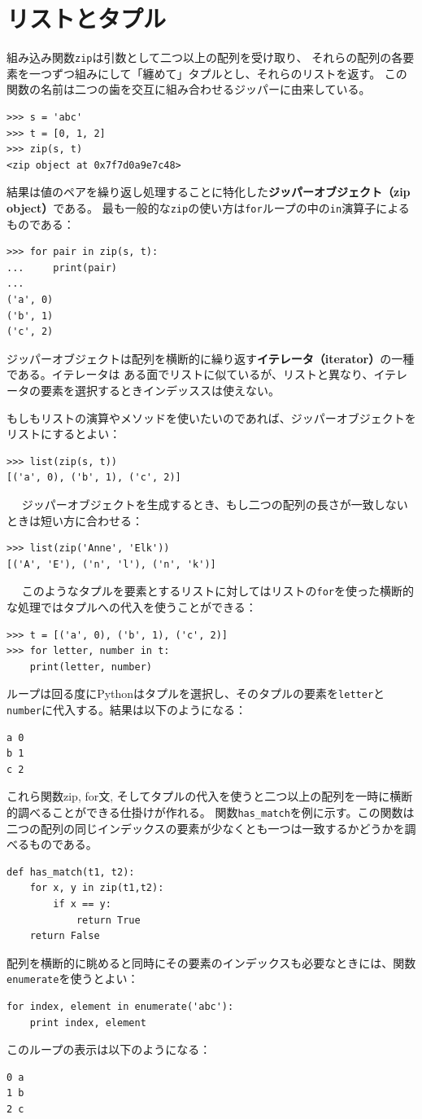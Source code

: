 \documentclass[a4j,12pt,makeidx]{jbook}
\begin{document}
\section{リストとタプル}
組み込み関数{\tt zip}は引数として二つ以上の配列を受け取り、
それらの配列の各要素を一つずつ組みにして「纏めて」タプルとし、それらのリストを返す。
この関数の名前は二つの歯を交互に組み合わせるジッパーに由来している。
\begin{verbatim}
>>> s = 'abc'
>>> t = [0, 1, 2]
>>> zip(s, t)
<zip object at 0x7f7d0a9e7c48>
\end{verbatim}
結果は値のペアを繰り返し処理することに特化した{\bf ジッパーオブジェクト（zip object）}である。
最も一般的な{\tt zip}の使い方は{\tt for}ループの中の{\tt in}演算子によるものである：
\begin{verbatim}
>>> for pair in zip(s, t):
...     print(pair)
...
('a', 0)
('b', 1)
('c', 2)
\end{verbatim}
ジッパーオブジェクトは配列を横断的に繰り返す{\bf イテレータ（iterator）}の一種である。イテレータは
ある面でリストに似ているが、リストと異なり、イテレータの要素を選択するときインデッススは使えない。\par
もしもリストの演算やメソッドを使いたいのであれば、ジッパーオブジェクトをリストにするとよい：
\begin{verbatim}
>>> list(zip(s, t))
[('a', 0), ('b', 1), ('c', 2)]
\end{verbatim}　
\indent
ジッパーオブジェクトを生成するとき、もし二つの配列の長さが一致しないときは短い方に合わせる：
\begin{verbatim}
>>> list(zip('Anne', 'Elk'))
[('A', 'E'), ('n', 'l'), ('n', 'k')]
\end{verbatim}　
\indent
このようなタプルを要素とするリストに対してはリストの{\tt for}を使った横断的な処理ではタプルへの代入を使うことができる：
\begin{verbatim}
>>> t = [('a', 0), ('b', 1), ('c', 2)]
>>> for letter, number in t:
	print(letter, number)
\end{verbatim}
ループは回る度にPythonはタプルを選択し、そのタプルの要素を{\tt letter}と{\tt number}に代入する。結果は以下のようになる：
\begin{verbatim}
a 0
b 1
c 2
\end{verbatim}
これら関数zip, for文, そしてタプルの代入を使うと二つ以上の配列を一時に横断的調べることができる仕掛けが作れる。
関数{\tt has\_match}を例に示す。この関数は二つの配列の同じインデックスの要素が少なくとも一つは一致するかどうかを調べるものである。
\begin{verbatim}
def has_match(t1, t2):
    for x, y in zip(t1,t2):
        if x == y:
            return True
    return False
\end{verbatim} 
\indent
配列を横断的に眺めると同時にその要素のインデックスも必要なときには、関数{\tt enumerate}を使うとよい：
\begin{verbatim}
for index, element in enumerate('abc'):
    print index, element
\end{verbatim}
このループの表示は以下のようになる：
\begin{verbatim}
0 a
1 b
2 c
\end{verbatim}
%
\end{document}
